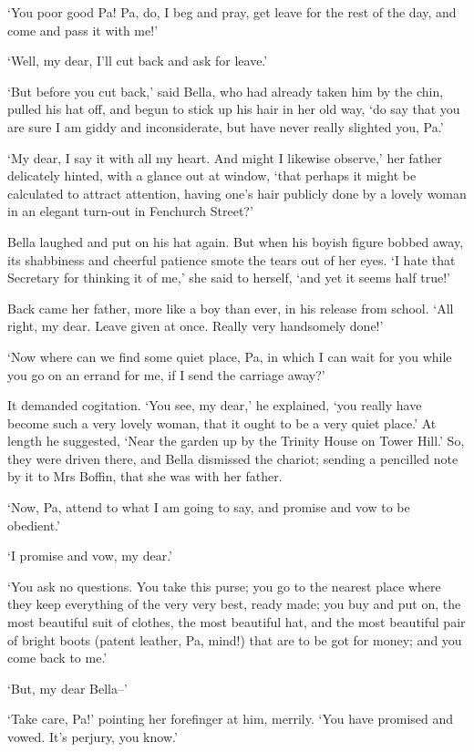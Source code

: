 ‘You poor good Pa! Pa, do, I beg and pray, get leave for the rest of the
day, and come and pass it with me!’

‘Well, my dear, I’ll cut back and ask for leave.’

‘But before you cut back,’ said Bella, who had already taken him by the
chin, pulled his hat off, and begun to stick up his hair in her old way,
‘do say that you are sure I am giddy and inconsiderate, but have never
really slighted you, Pa.’

‘My dear, I say it with all my heart. And might I likewise observe,’ her
father delicately hinted, with a glance out at window, ‘that perhaps
it might be calculated to attract attention, having one’s hair publicly
done by a lovely woman in an elegant turn-out in Fenchurch Street?’

Bella laughed and put on his hat again. But when his boyish figure
bobbed away, its shabbiness and cheerful patience smote the tears out
of her eyes. ‘I hate that Secretary for thinking it of me,’ she said to
herself, ‘and yet it seems half true!’

Back came her father, more like a boy than ever, in his release from
school. ‘All right, my dear. Leave given at once. Really very handsomely
done!’

‘Now where can we find some quiet place, Pa, in which I can wait for you
while you go on an errand for me, if I send the carriage away?’

It demanded cogitation. ‘You see, my dear,’ he explained, ‘you really
have become such a very lovely woman, that it ought to be a very quiet
place.’ At length he suggested, ‘Near the garden up by the Trinity House
on Tower Hill.’ So, they were driven there, and Bella dismissed the
chariot; sending a pencilled note by it to Mrs Boffin, that she was with
her father.

‘Now, Pa, attend to what I am going to say, and promise and vow to be
obedient.’

‘I promise and vow, my dear.’

‘You ask no questions. You take this purse; you go to the nearest place
where they keep everything of the very very best, ready made; you buy
and put on, the most beautiful suit of clothes, the most beautiful hat,
and the most beautiful pair of bright boots (patent leather, Pa, mind!)
that are to be got for money; and you come back to me.’

‘But, my dear Bella--’

‘Take care, Pa!’ pointing her forefinger at him, merrily. ‘You have
promised and vowed. It’s perjury, you know.’

